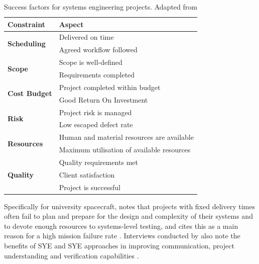 \documentclass[a4paper,nobib,justified,final]{tufte-book}
\begin{document}
\begin{table}[h]
	\caption[Success factors for systems engineering projects]{Success factors for systems engineering projects. Adapted from \cite{akbarStatisticalAnalysisEffects2018}}
	\label{tab:i_success_factors}
	\begin{tabularx}{\linewidth}{@{}lX@{}}
		\toprule
		\textbf{Constraint} & \textbf{Aspect} \\ \midrule
		\multirow{2}{*}{\textbf{Scheduling}}
		& Delivered on time \\
		& Agreed workflow followed \\ \midrule
		\multirow{2}{*}{\textbf{Scope}}
		& Scope is well-defined \\
		& Requirements completed \\  \midrule
		\multirow{2}{*}{\textbf{Cost Budget}} & Project completed within budget \\
		& Good Return On Investment \\ \midrule
		\multirow{2}{*}{\textbf{Risk}} & Project risk is managed \\
		& Low escaped defect rate \\ \midrule
		\multirow{2}{*}{\textbf{Resources}} & Human and material resources are available \\
		& Maximum utilisation of available resources \\ \midrule
		\multirow{3}{*}{\textbf{Quality}} & Quality requirements met \\
		& Client satisfaction \\
		& Project is successful \\ \bottomrule
	\end{tabularx}
\end{table}

Specifically for university spacecraft, \citeauthor{swartwoutUniversityClassSpacecraft2023} notes that projects with fixed delivery times often fail to plan and prepare for the design and complexity of their systems and to devote enough resources to systems-level testing, and cites this as a main reason for a high mission failure rate \autocite{swartwoutUniversityClassSpacecraft2023}. Interviews conducted by \citeauthor{campoModelbasedSystemsEngineering2023,honore-livermoreAcademicsPerceptionSystems2022} also note the benefits of \acs{SYE} and \acs{SYE} approaches in improving communication, project understanding and verification capabilities \autocite{campoModelbasedSystemsEngineering2023,honore-livermoreDigitalEngineeringDevelopment2022}.
\end{document}
